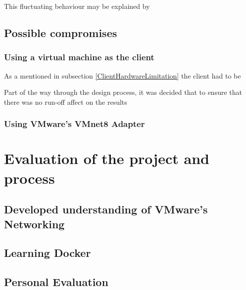 This fluctuating behaviour may be explained by


\section{Possible compromises}

\subsection{Using a virtual machine as the client}%
\label{compr:client}
As a mentioned in subsection \ref{ClientHardwareLimitation} the client had to be 

Part of the way through the design process, it was decided that to ensure that there was no run-off affect on the results


\subsection{Using VMware's VMnet8 Adapter}%





\chapter{Evaluation of the project and process}%

\section{Developed understanding of VMware's Networking}

\section{Learning Docker}

\section{Personal Evaluation}%